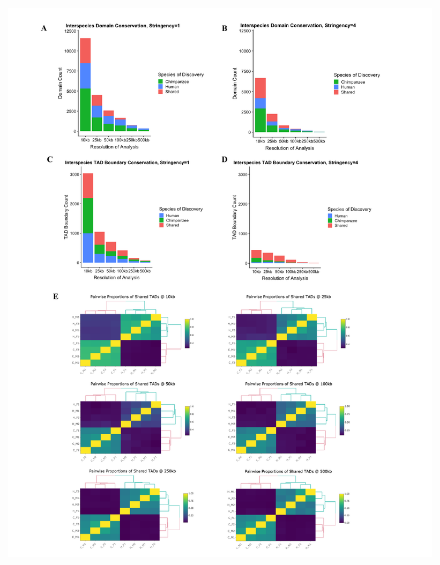 \begin{figure}[!htb]
\label{fig:ch02-figS13}
\end{figure}

\begin{figure}[!htb]
\centering
\includegraphics[width=6in]{img/figS14.1.pdf}
\end{figure}

